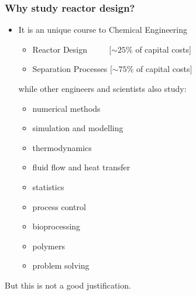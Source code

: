 \begin{frame}\frametitle{Why study reactor design?}
	\begin{itemize}
		\item	It is an unique course to Chemical Engineering
			\begin{itemize}
				\item	Reactor Design $\qquad\,\,$[$\sim 25$\% of capital costs]
				\item	Separation Processes [$\sim 75$\% of capital costs]
			\end{itemize}
			\vspace{12pt}
			while other engineers and scientists also study:
			\begin{itemize}
				\item	numerical methods
				\item	simulation and modelling
				\item	thermodynamics
				\item	fluid flow and heat transfer
				\item	statistics
				\item	process control
				\item	bioprocessing
				\item	polymers
				\item	problem solving
			\end{itemize}
	\end{itemize}
	But this is not a good justification.
\end{frame}

